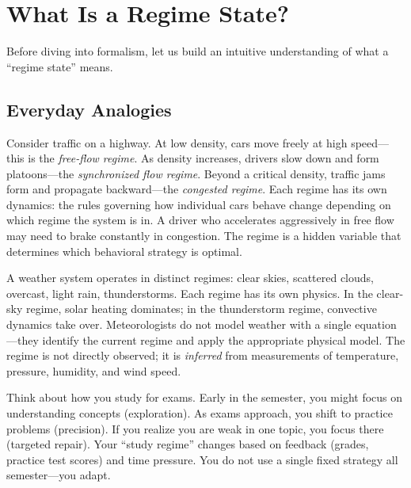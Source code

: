 \section{What Is a Regime State?}
\label{sec:what-is-regime}

Before diving into formalism, let us build an intuitive understanding of what a ``regime state'' means.

\subsection{Everyday Analogies}

\begin{example}
Consider traffic on a highway. At low density, cars move freely at high speed---this is the \emph{free-flow regime}. As density increases, drivers slow down and form platoons---the \emph{synchronized flow regime}. Beyond a critical density, traffic jams form and propagate backward---the \emph{congested regime}. Each regime has its own dynamics: the rules governing how individual cars behave change depending on which regime the system is in. A driver who accelerates aggressively in free flow may need to brake constantly in congestion. The regime is a hidden variable that determines which behavioral strategy is optimal.
\end{example}

\begin{example}
A weather system operates in distinct regimes: clear skies, scattered clouds, overcast, light rain, thunderstorms. Each regime has its own physics. In the clear-sky regime, solar heating dominates; in the thunderstorm regime, convective dynamics take over. Meteorologists do not model weather with a single equation---they identify the current regime and apply the appropriate physical model. The regime is not directly observed; it is \emph{inferred} from measurements of temperature, pressure, humidity, and wind speed.
\end{example}

\begin{example}
Think about how you study for exams. Early in the semester, you might focus on understanding concepts (exploration). As exams approach, you shift to practice problems (precision). If you realize you are weak in one topic, you focus there (targeted repair). Your ``study regime'' changes based on feedback (grades, practice test scores) and time pressure. You do not use a single fixed strategy all semester---you adapt.
\end{example}


